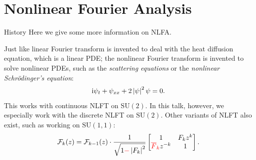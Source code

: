 \section{Nonlinear Fourier Analysis}
\begin{frame}{History}
    Here we give some more information on NLFA.

    Just like linear Fourier transform is invented to deal with the heat diffusion equation, which is a linear PDE; the nonlinear Fourier transform is invented to solve nonlinear PDEs, such as the \textit{scattering equations} or the \textit{nonlinear Schr\"odinger's equation}:
    \begin{equation*}
        \mathrm{i}\psi_t + \psi_{xx} + 2\left|{\psi}\right|^2 \psi = 0.
    \end{equation*}
    This works with continuous NLFT on $\mathrm{SU}(2)$. In this talk, however, we especially work with the discrete NLFT on $\mathrm{SU}(2)$. Other variants of NLFT also exist, such as working on $\mathrm{SU}(1,1)$:
    \begin{equation*}
        \mathcal{F}_{k}(z) = \mathcal{F}_{k-1}(z) \cdot \frac{1}{\sqrt{1{\color{red}-}\left|{F_k}\right|^2}} \left[\begin{matrix}
            1 & F_kz^k \\ {\color{red}\overline{F}_k}z^{-k} & 1
        \end{matrix}\right].
    \end{equation*}
\end{frame}

